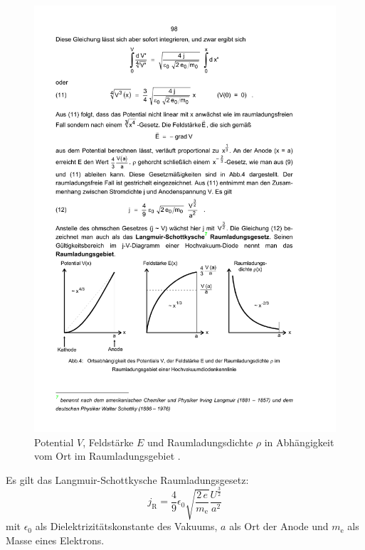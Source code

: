 \begin{figure}
  \centering
  \includegraphics[scale=0.6]{content/raumladungsgebiet.pdf}
\caption{ Potential $V$, Feldstärke $E$  und Raumladungsdichte $\rho$ in Abhängigkeit vom Ort im Raumladungsgebiet \cite{anleitung504}.}
  \label{fig:raumladung}
\end{figure}
Es gilt das Langmuir-Schottkysche Raumladungsgesetz:
\begin{equation}
  \label{eqn:langmuir}
  j_\mathrm{R}=\frac{4}{9} \epsilon_0 \sqrt{\frac{2\,e}{m_\mathrm{e}}}\frac{U^{\frac{3}{2}}}{a^2}
\end{equation}
mit $\epsilon_0$ als Dielektrizitätskonstante des Vakuums, $a$ als Ort der Anode und $m_\mathrm{e}$ als Masse eines Elektrons.

